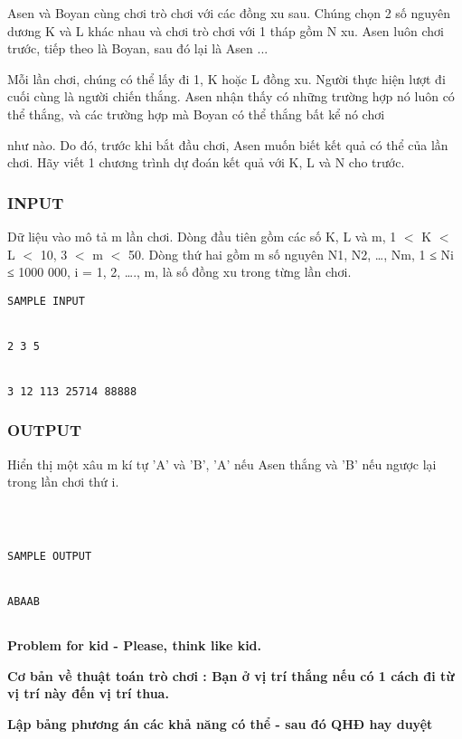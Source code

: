 







   Asen và Boyan cùng chơi trò chơi với các đồng xu sau. Chúng chọn 2 số nguyên dương K và L khác nhau và chơi trò chơi với 1 tháp gồm N xu. Asen luôn chơi trước, tiếp theo là Boyan, sau đó lại là Asen ...  

   Mỗi lần chơi, chúng có thể lấy đi 1, K hoặc L đồng xu. Người thực hiện lượt đi cuối cùng là người chiến thắng. Asen  nhận thấy có những trường hợp nó luôn có thể thắng, và các trường hợp mà Boyan có thể thắng bất kể nó chơi   


   như nào. Do đó, trước khi bắt đầu chơi, Asen muốn biết kết quả có thể của lần chơi. Hãy viết 1 chương trình dự đoán kết quả với K, L và N cho trước.  

\subsubsection{   INPUT  }

   Dữ liệu vào mô tả m lần chơi. Dòng đầu tiên gồm các số  K, L và m, 1 $<$ K $<$ L $<$ 10, 3 $<$ m $<$ 50. Dòng thứ hai gồm m số nguyên N1, N2, …, Nm, 1 ≤ Ni ≤ 1000 000,  i = 1, 2, …., m, là số đồng xu trong từng lần chơi.  
\begin{verbatim}
SAMPLE INPUT


2 3 5 


3 12 113 25714 88888\end{verbatim}

\subsubsection{   OUTPUT  }

   Hiển thị một xâu m kí tự 'A' và 'B', 'A' nếu Asen thắng và 'B' nếu ngược lại trong lần chơi thứ i.  
\begin{verbatim}



SAMPLE OUTPUT


ABAAB


\end{verbatim}

\textbf{    Problem for kid - Please, think like kid.   }


\textbf{    Cơ bản về thuật toán trò chơi : Bạn ở vị trí thắng nếu có 1 cách đi từ vị trí này đến vị trí thua.   }


\textbf{    Lập bảng phương án các khả năng có thể - sau đó QHĐ hay duyệt   }

